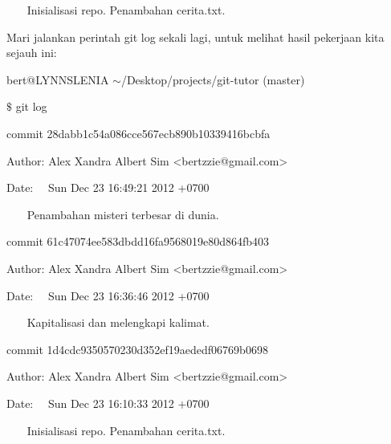 \noindent 
\vspace{10pt}
\noindent 
{\fontsize{10pt}{10pt}\selectfont ~~~ Inisialisasi repo. Penambahan cerita.txt.} \par
\vspace{12pt}
\noindent 
Mari jalankan perintah git log sekali lagi, untuk melihat hasil pekerjaan kita sejauh ini: \par
\noindent 
{\fontsize{10pt}{10pt}\selectfont bert@LYNNSLENIA  $  \sim  $/Desktop/projects/git-tutor (master)} \par
\noindent 
{\fontsize{10pt}{10pt}\selectfont  $  \$  $ git log} \par
\noindent 
{\fontsize{10pt}{10pt}\selectfont commit 28dabb1c54a086cce567ecb890b10339416bcbfa} \par
\noindent 
{\fontsize{10pt}{10pt}\selectfont Author: Alex Xandra Albert Sim <bertzzie@gmail.com>} \par
\noindent 
{\fontsize{10pt}{10pt}\selectfont Date:~~ Sun Dec 23 16:49:21 2012 +0700} \par
\noindent 
\vspace{10pt}
\noindent 
{\fontsize{10pt}{10pt}\selectfont ~~~ Penambahan misteri terbesar di dunia.} \par
\noindent 
\vspace{10pt}
\noindent 
{\fontsize{10pt}{10pt}\selectfont commit 61c47074ee583dbdd16fa9568019e80d864fb403} \par
\noindent 
{\fontsize{10pt}{10pt}\selectfont Author: Alex Xandra Albert Sim <bertzzie@gmail.com>} \par
\noindent 
{\fontsize{10pt}{10pt}\selectfont Date:~~ Sun Dec 23 16:36:46 2012 +0700} \par
\noindent 
\vspace{10pt}
\noindent 
{\fontsize{10pt}{10pt}\selectfont ~~~ Kapitalisasi dan melengkapi kalimat.} \par
\noindent 
\vspace{10pt}
\noindent 
{\fontsize{10pt}{10pt}\selectfont commit 1d4cdc9350570230d352ef19aededf06769b0698} \par
\noindent 
{\fontsize{10pt}{10pt}\selectfont Author: Alex Xandra Albert Sim <bertzzie@gmail.com>} \par
\noindent 
{\fontsize{10pt}{10pt}\selectfont Date:~~ Sun Dec 23 16:10:33 2012 +0700} \par
\noindent 
\vspace{10pt}
\noindent 
{\fontsize{10pt}{10pt}\selectfont ~~~ Inisialisasi repo. Penambahan cerita.txt.} \par
